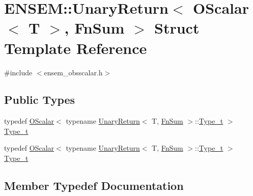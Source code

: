 \hypertarget{structENSEM_1_1UnaryReturn_3_01OScalar_3_01T_01_4_00_01FnSum_01_4}{}\section{E\+N\+S\+EM\+:\+:Unary\+Return$<$ O\+Scalar$<$ T $>$, Fn\+Sum $>$ Struct Template Reference}
\label{structENSEM_1_1UnaryReturn_3_01OScalar_3_01T_01_4_00_01FnSum_01_4}


{\ttfamily \#include $<$ensem\+\_\+obsscalar.\+h$>$}

\subsection*{Public Types}
\begin{DoxyCompactItemize}
\item 
typedef \mbox{\hyperlink{classENSEM_1_1OScalar}{O\+Scalar}}$<$ typename \mbox{\hyperlink{structENSEM_1_1UnaryReturn}{Unary\+Return}}$<$ T, \mbox{\hyperlink{structENSEM_1_1FnSum}{Fn\+Sum}} $>$\+::\mbox{\hyperlink{structENSEM_1_1UnaryReturn_3_01OScalar_3_01T_01_4_00_01FnSum_01_4_a02ee406ef93cadbda63ffae33a8ef25a}{Type\+\_\+t}} $>$ \mbox{\hyperlink{structENSEM_1_1UnaryReturn_3_01OScalar_3_01T_01_4_00_01FnSum_01_4_a02ee406ef93cadbda63ffae33a8ef25a}{Type\+\_\+t}}
\item 
typedef \mbox{\hyperlink{classENSEM_1_1OScalar}{O\+Scalar}}$<$ typename \mbox{\hyperlink{structENSEM_1_1UnaryReturn}{Unary\+Return}}$<$ T, \mbox{\hyperlink{structENSEM_1_1FnSum}{Fn\+Sum}} $>$\+::\mbox{\hyperlink{structENSEM_1_1UnaryReturn_3_01OScalar_3_01T_01_4_00_01FnSum_01_4_a02ee406ef93cadbda63ffae33a8ef25a}{Type\+\_\+t}} $>$ \mbox{\hyperlink{structENSEM_1_1UnaryReturn_3_01OScalar_3_01T_01_4_00_01FnSum_01_4_a02ee406ef93cadbda63ffae33a8ef25a}{Type\+\_\+t}}
\end{DoxyCompactItemize}


\subsection{Member Typedef Documentation}
\mbox{\label{structENSEM_1_1UnaryReturn_3_01OScalar_3_01T_01_4_00_01FnSum_01_4_a02ee406ef93cadbda63ffae33a8ef25a}} 
